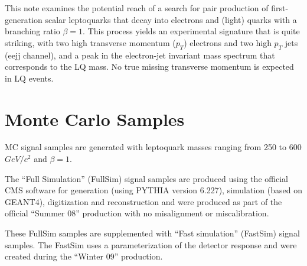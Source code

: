 \documentclass{cmspaper}
\begin{document}
\begin{linenumbers}
This note examines the potential reach of a search for
pair production of first-generation 
scalar leptoquarks that decay into electrons and 
(light) quarks with a branching ratio $\beta=1$. 
This process yields an experimental signature that
is quite striking, with two 
high transverse momentum ($p_T$) electrons 
and two high $p_T$ jets (eejj channel), and
a peak in the electron-jet invariant mass 
spectrum that corresponds to the LQ mass. 
No true missing transverse momentum is expected in LQ events.


\section{Monte Carlo Samples} \label{sec:MCSamples}
MC signal samples are generated with leptoquark masses ranging from 
250 to 600 $GeV/c^2$ and $\beta=1$. 

The ``Full Simulation'' (FullSim) signal samples are produced using 
the official CMS software for generation (using PYTHIA version 6.227), 
simulation (based on GEANT4), digitization and reconstruction 
and were produced as part of the official ``Summer 08'' 
production with no misalignment or miscalibration.

These FullSim samples are supplemented with
``Fast simulation'' (FastSim) signal samples. 
The FastSim uses a parameterization of the 
detector response and were created during the ``Winter 09'' production.


\end{linenumbers}
\end{document}
